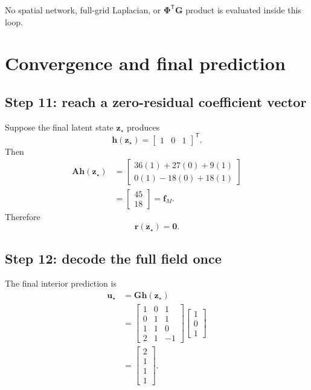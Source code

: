 \documentclass[11pt]{article}
\newcommand{\mat}[1]{\mathbf{#1}}
\newcommand{\vect}[1]{\mathbf{#1}}
\begin{document}
No spatial network, full-grid Laplacian, or $\mat{\Phi}^{\mathsf T}\mat{G}$
product is evaluated inside this loop.

\section{Convergence and final prediction}

\subsection{Step 11: reach a zero-residual coefficient vector}

Suppose the final latent state $\vect{z}_\star$ produces
\begin{equation}
  \vect{h}(\vect{z}_\star)
  =\begin{bmatrix}1&0&1\end{bmatrix}^{\mathsf T}.
\end{equation}
Then
\begin{align}
  \mat{A}\vect{h}(\vect{z}_\star)
  &=\begin{bmatrix}
      36(1)+27(0)+9(1)\\
      0(1)-18(0)+18(1)
    \end{bmatrix}\\
  &=\begin{bmatrix}45\\18\end{bmatrix}
   =\vect{f}_M.
\end{align}
Therefore
\begin{equation}
  \vect{r}(\vect{z}_\star)=\vect{0}.
\end{equation}

\subsection{Step 12: decode the full field once}

The final interior prediction is
\begin{align}
  \vect{u}_\star
  &=\mat{G}\vect{h}(\vect{z}_\star)\\
  &=
  \begin{bmatrix}
      1&0& 1\\
      0&1& 1\\
      1&1& 0\\
      2&1&-1
    \end{bmatrix}
  \begin{bmatrix}1\\0\\1\end{bmatrix}\\
  &=\begin{bmatrix}2\\1\\1\\1\end{bmatrix}.
\end{align}
\end{document}
